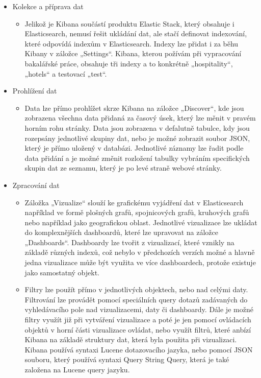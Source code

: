 \documentclass[czech,BP]{thesiskiv2}
\begin{document}
 \begin{itemize}
 	\item Kolekce a příprava dat
 	\begin{itemize}
 		\item Jelikož je Kibana součástí produktu Elastic Stack, který obsahuje i Elasticsearch, nemusí řešit ukládání dat, ale stačí definovat indexování, které odpovídá indexům v Elasticsearch. Indexy lze přidat i za běhu Kibany v záložce „Settings“. Kibana, kterou požívám při vypracování bakalářské práce, obsahuje tři indexy a to konkrétně „hospitality“, „hotels“ a testovací „test“. 
 	\end{itemize}
	\item Prohlížení dat
	\begin{itemize}
		\item Data lze přímo prohlížet skrze Kibana na záložce „Discover“, kde jsou zobrazena všechna data přidaná za časový úsek, který lze měnit v pravém horním rohu stránky. Data jsou zobrazena v defalutně tabulce, kdy jsou rozepsány jednotlivé skupiny dat, nebo je možné zobrazit soubor JSON, který je přímo uložený  v databázi. Jednotlivé záznamy lze řadit podle data přidání a je možné změnit rozložení tabulky vybráním specifických skupin dat ze seznamu, který je po levé straně webové stránky.
	\end{itemize}
 	\item Zpracování dat
 	\begin{itemize}
 		\item Záložka „Vizualize“ slouží ke grafickému vyjádření dat v Elasticsearch například ve formě plošných grafů, spojnicových grafů, kruhových grafů nebo například jako geografickou oblast. Jednotlivé vizualizace lze ukládat do komplexnějších dashboardů, které lze upravovat na záložce „Dashboards“. Dashboardy lze tvořit z vizualizací, které vznikly na základě různých indexů, což nebylo v předchozích verzích možné a hlavně jedna vizualizace může být využita ve více dashboardech, protože existuje jako samostatný objekt.
 		
 		\item Filtry lze použít přímo v jednotlivých objektech, nebo nad celými daty. Filtrování lze provádět pomocí speciálních query dotazů zadávaných do vyhledávacího pole nad vizualizacemi, daty či dashboardy. Dále je možné filtry využít již při vytváření vizualizace a poté je jen pomocí ovládacích objektů v horní části vizualizace ovládat, nebo využít filtrů, které anbízí Kibana na základě struktury dat, která byla použita při vizualizaci. Kibana používá syntaxi Lucene dotazovacího jazyka, nebo pomocí JSON souboru, který používá syntaxi  Query String Query, která je také založena na Lucene query jazyku.\cite{KibanaQueries}
 	\end{itemize}
 \end{itemize}
 
\end{document}
